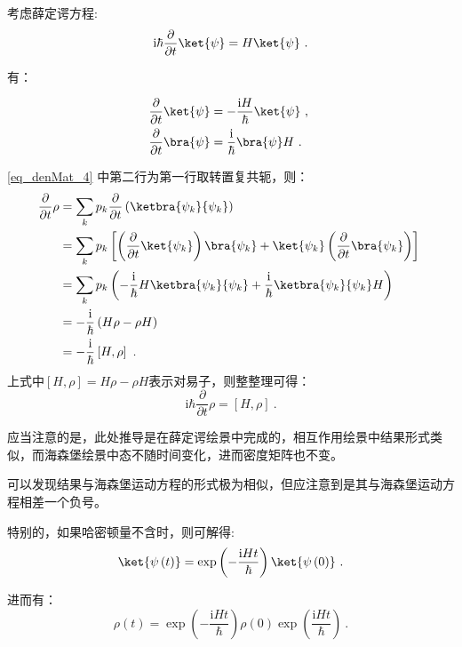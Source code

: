 \begin{itemize}
    考虑薛定谔方程:
    $$\mathrm{i}\hbar\frac{\partial}{\partial t} \ket{\psi} = H \ket{\psi}~.$$

    有：

    \begin{equation}\label{eq_denMat_4}
    \begin{aligned}
    \frac{\partial}{\partial t}\ket{\psi} &= -\frac{\mathrm{i}H}{\hbar}\ket{\psi}~, \\
    \frac{\partial}{\partial t}\bra{\psi} &= \frac{\mathrm{i}}{\hbar}\bra{\psi}H~.
    \end{aligned}~
    \end{equation}

    \autoref{eq_denMat_4} 中第二行为第一行取转置复共轭，则：
    \begin{equation}\label{eq_denMat_2}
    \begin{aligned}
    \frac{\partial}{\partial t}\rho &= \sum\limits_kp_k\frac{\partial}{\partial t}\left( \ketbra{\psi_k}{\psi_k} \right) \\
    &= \sum\limits_k p_k\left[ \left(\frac{\partial}{\partial t}\ket{\psi_k}\right)\bra{\psi_k} + \ket{\psi_k}\left(\frac{\partial}{\partial t}\bra{\psi_k}\right)\right] \\ 
    &= \sum\limits_k p_k \left( -\frac{\mathrm{i}}{\hbar}H\ketbra{\psi_k}{\psi_k} + \frac{\mathrm{i}}{\hbar}\ketbra{\psi_k}{\psi_k}H \right) \\
    &=-\frac{\mathrm{i}}{\hbar}\left(  H\rho -  \rho H\right) \\
    &= -\frac{\mathrm{i}}{\hbar}\left[ H, \rho \right]~.
    \end{aligned}~
    \end{equation}
    上式中$\left[ H, \rho \right] = H\rho -  \rho H$表示对易子，则整整理可得：
    \begin{equation}\label{eq_denMat_5}
    \mathrm{i}\hbar \frac{\partial}{\partial t} \rho= \left[ H, \rho \right]~.
    \end{equation}

    应当注意的是，此处推导是在薛定谔绘景中完成的，相互作用绘景中结果形式类似，而海森堡绘景中态不随时间变化，进而密度矩阵也不变。

    可以发现结果与海森堡运动方程的形式极为相似，但应注意到是其与海森堡运动方程相差一个负号。

    特别的，如果哈密顿量不含时，则可解得:
    $$\ket{\psi\left( t\right)} = \exp\left(-\frac{\mathrm{i}Ht}{\hbar}\right)\ket{\psi\left(0\right)}~.$$

    进而有：
    \begin{equation}\label{eq_denMat_6}
    \rho \left( t \right) = \exp\left(-\frac{\mathrm{i}Ht}{\hbar}\right) \rho \left(0\right) \exp\left(\frac{\mathrm{i}Ht}{\hbar}\right)~.
    \end{equation}
    

\end{itemize}
